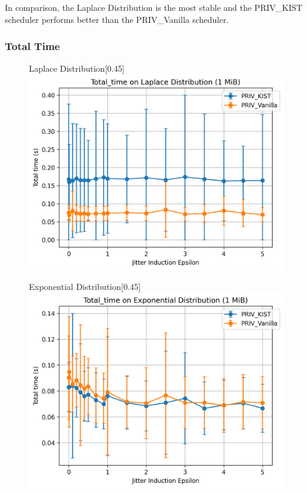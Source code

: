 In comparison, the Laplace Distribution is the most stable and the PRIV\_KIST scheduler performs better than the PRIV\_Vanilla scheduler. 

\subsubsection{Total Time}\label{sec:performance_evaluation_total_time_jitter_injectors_tor_schedulers}

\begin{figure}[htbp]
    \centering
    \begin{subcaptionbox}{Laplace Distribution\label{fig:jitter_total_time_laplace}}[0.45\textwidth]
        {\includegraphics[width=\linewidth]{Chapters/Figures/Plots/Jitter/total_time_jitter_Laplace_1_mib.png}}
    \end{subcaptionbox}
    \hfill
    \begin{subcaptionbox}{Exponential Distribution\label{fig:jitter_total_time_exponential}}[0.45\textwidth]
        {\includegraphics[width=\linewidth]{Chapters/Figures/Plots/Jitter/total_time_jitter_Exponential_1_mib.png}}

\end{subcaptionbox}
\end{figure}
